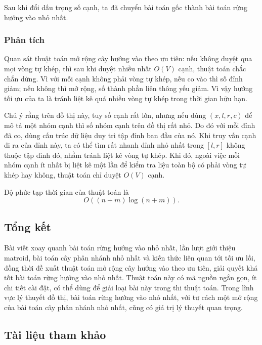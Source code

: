 \documentclass[11pt]{article}
\begin{document}
Sau khi đổi dấu trọng số cạnh, ta đã chuyển bài toán gốc thành bài toán rừng
hướng vào nhỏ nhất.

\subsubsection{Phân tích}

Quan sát thuật toán mở rộng cây hướng vào theo ưu tiên: nếu không duyệt qua mọi
vòng tự khép, thì sau khi duyệt nhiều nhất \(O(V)\) cạnh, thuật toán chắc chắn
dừng. Vì với mỗi cạnh không phải vòng tự khép, nếu co vào thì số đỉnh giảm; nếu
không thì mở rộng, số thành phần liên thông yếu giảm. Vì vậy hướng tối ưu của
ta là tránh liệt kê quá nhiều vòng tự khép trong thời gian hữu hạn.

Chú ý rằng trên đồ thị này, tuy số cạnh rất lớn, nhưng nếu dùng \((x,l,r,c)\)
để mô tả một nhóm cạnh thì số nhóm cạnh trên đồ thị rất nhỏ. Do đó với mỗi đỉnh
đã co, dùng cấu trúc dữ liệu duy trì tập đỉnh ban đầu của nó. Khi truy vấn cạnh
đi ra của đỉnh này, ta có thể tìm rất nhanh đỉnh nhỏ nhất trong \([l,r]\) không
thuộc tập đỉnh đó, nhằm tránh liệt kê vòng tự khép. Khi đó, ngoài việc mỗi nhóm
cạnh ít nhất bị liệt kê một lần để kiểm tra liệu toàn bộ có phải vòng tự khép
hay không, thuật toán chỉ duyệt \(O(V)\) cạnh.

Độ phức tạp thời gian của thuật toán là
\[
O((n+m)\log(n+m)).
\]

\subsection{Tổng kết}

Bài viết xoay quanh bài toán rừng hướng vào nhỏ nhất, lần lượt giới thiệu
matroid, bài toán cây phân nhánh nhỏ nhất và kiến thức liên quan tới tối ưu
lồi, đồng thời đề xuất thuật toán mở rộng cây hướng vào theo ưu tiên, giải
quyết khá tốt bài toán rừng hướng vào nhỏ nhất. Thuật toán này có mã nguồn ngắn
gọn, ít chi tiết cài đặt, có thể dùng để giải loại bài này trong thi thuật
toán. Trong lĩnh vực lý thuyết đồ thị, bài toán rừng hướng vào nhỏ nhất, với tư
cách một mở rộng của bài toán cây phân nhánh nhỏ nhất, cũng có giá trị lý thuyết
quan trọng.

\subsection*{Tài liệu tham khảo}
\end{document}
